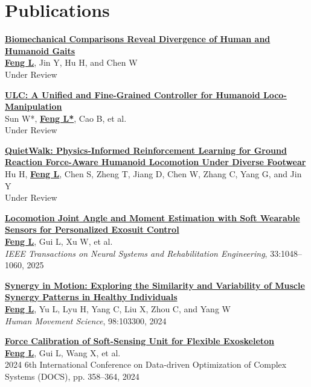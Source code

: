 \documentclass[a4paper,11pt]{article}
\begin{document}
\section{\textbf{Publications}}
\small{
\begin{enumerate}[leftmargin=*, labelsep=0.5em, align=left, itemindent=0em, label={[\arabic*]}]
\item \href{https://arxiv.org/abs/2602.21666v1}{\textbf{Biomechanical Comparisons Reveal Divergence of Human and Humanoid Gaits}}\\
\underline{\textbf{Feng L}}, Jin Y, Hu H, and Chen W\\
Under Review

\item \href{https://arxiv.org/abs/2507.06905}{\textbf{ULC: A Unified and Fine-Grained Controller for Humanoid Loco-Manipulation}}\\
Sun W*, \underline{\textbf{Feng L*}}, Cao B, et al.\\
Under Review

\item \href{https://arxiv.org/abs/2604.23702}{\textbf{QuietWalk: Physics-Informed Reinforcement Learning for Ground Reaction Force-Aware Humanoid Locomotion Under Diverse Footwear}}\\
Hu H, \underline{\textbf{Feng L}}, Chen S, Zheng T, Jiang D, Chen W, Zhang C, Yang G, and Jin Y\\
Under Review

\item \href{https://doi.org/10.1109/TNSRE.2025.3547361}{\textbf{Locomotion Joint Angle and Moment Estimation with Soft Wearable Sensors for Personalized Exosuit Control}}\\
\underline{\textbf{Feng L}}, Gui L, Xu W, et al.\\
\textit{IEEE Transactions on Neural Systems and Rehabilitation Engineering}, 33:1048--1060, 2025

\item \href{https://doi.org/10.1016/j.humov.2024.103300}{\textbf{Synergy in Motion: Exploring the Similarity and Variability of Muscle Synergy Patterns in Healthy Individuals}}\\
\underline{\textbf{Feng L}}, Yu L, Lyu H, Yang C, Liu X, Zhou C, and Yang W\\
\textit{Human Movement Science}, 98:103300, 2024

\item \href{https://ieeexplore.ieee.org/document/10704430}{\textbf{Force Calibration of Soft-Sensing Unit for Flexible Exoskeleton}}\\
\underline{\textbf{Feng L}}, Gui L, Wang X, et al.\\
2024 6th International Conference on Data-driven Optimization of Complex Systems (DOCS), pp. 358--364, 2024


\end{enumerate}}
\end{document}
